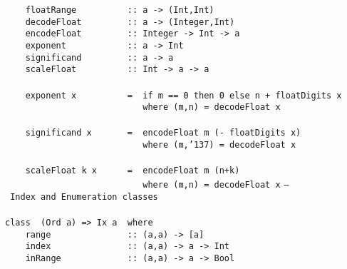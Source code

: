 \mbox{\tt \ \ \ \ floatRange\ \ \ \ \ \ \ \ \ \ ::\ a\ ->\ (Int,Int)}\\
\mbox{\tt \ \ \ \ decodeFloat\ \ \ \ \ \ \ \ \ ::\ a\ ->\ (Integer,Int)}\\
\mbox{\tt \ \ \ \ encodeFloat\ \ \ \ \ \ \ \ \ ::\ Integer\ ->\ Int\ ->\ a}\\
\mbox{\tt \ \ \ \ exponent\ \ \ \ \ \ \ \ \ \ \ \ ::\ a\ ->\ Int}\\
\mbox{\tt \ \ \ \ significand\ \ \ \ \ \ \ \ \ ::\ a\ ->\ a}\\
\mbox{\tt \ \ \ \ scaleFloat\ \ \ \ \ \ \ \ \ \ ::\ Int\ ->\ a\ ->\ a}\\
\mbox{\tt }\\[-8pt]
\mbox{\tt \ \ \ \ exponent\ x\ \ \ \ \ \ \ \ \ \ =\ \ if\ m\ ==\ 0\ then\ 0\ else\ n\ +\ floatDigits\ x}\\
\mbox{\tt \ \ \ \ \ \ \ \ \ \ \ \ \ \ \ \ \ \ \ \ \ \ \ \ \ \ \ where\ (m,n)\ =\ decodeFloat\ x}\\
\mbox{\tt }\\[-8pt]
\mbox{\tt \ \ \ \ significand\ x\ \ \ \ \ \ \ =\ \ encodeFloat\ m\ (-\ floatDigits\ x)}\\
\mbox{\tt \ \ \ \ \ \ \ \ \ \ \ \ \ \ \ \ \ \ \ \ \ \ \ \ \ \ \ where\ (m,{\char'137})\ =\ decodeFloat\ x}\\
\mbox{\tt }\\[-8pt]
\mbox{\tt \ \ \ \ scaleFloat\ k\ x\ \ \ \ \ \ =\ \ encodeFloat\ m\ (n+k)}\\
\mbox{\tt \ \ \ \ \ \ \ \ \ \ \ \ \ \ \ \ \ \ \ \ \ \ \ \ \ \ \ where\ (m,n)\ =\ decodeFloat\ x}
%
%
%
%
%
%
%
%
%
%
%
\eprogB\noindent\bprogB
\mbox{\tt --\ Index\ and\ Enumeration\ classes}\\
\mbox{\tt }\\[-8pt]
\mbox{\tt class\ \ (Ord\ a)\ =>\ Ix\ a\ \ where}\\
\mbox{\tt \ \ \ \ range\ \ \ \ \ \ \ \ \ \ \ \ \ \ \ ::\ (a,a)\ ->\ [a]}\\
\mbox{\tt \ \ \ \ index\ \ \ \ \ \ \ \ \ \ \ \ \ \ \ ::\ (a,a)\ ->\ a\ ->\ Int}\\
\mbox{\tt \ \ \ \ inRange\ \ \ \ \ \ \ \ \ \ \ \ \ ::\ (a,a)\ ->\ a\ ->\ Bool}
%
%
%
%
